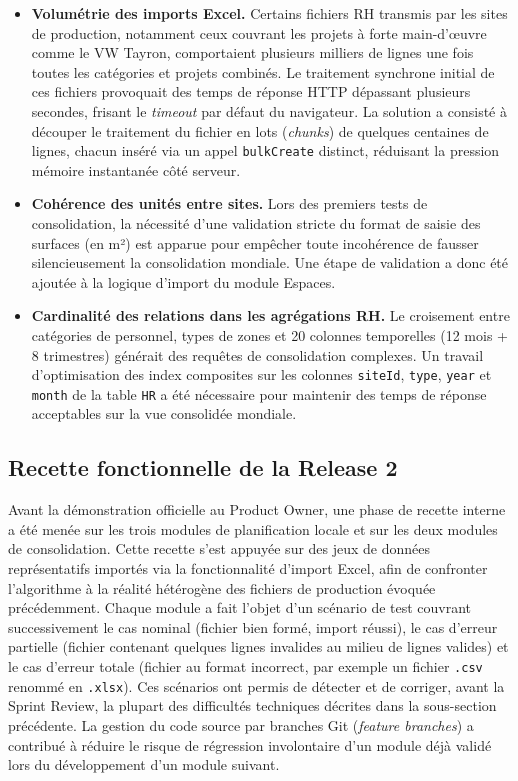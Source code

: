 \begin{itemize}
    \item \textbf{Volumétrie des imports Excel.} Certains fichiers RH transmis par les sites de production, notamment ceux couvrant les projets à forte main-d'œuvre comme le VW Tayron, comportaient plusieurs milliers de lignes une fois toutes les catégories et projets combinés. Le traitement synchrone initial de ces fichiers provoquait des temps de réponse HTTP dépassant plusieurs secondes, frisant le \textit{timeout} par défaut du navigateur. La solution a consisté à découper le traitement du fichier en lots (\textit{chunks}) de quelques centaines de lignes, chacun inséré via un appel \texttt{bulkCreate} distinct, réduisant la pression mémoire instantanée côté serveur.
    \item \textbf{Cohérence des unités entre sites.} Lors des premiers tests de consolidation, la nécessité d'une validation stricte du format de saisie des surfaces (en m²) est apparue pour empêcher toute incohérence de fausser silencieusement la consolidation mondiale. Une étape de validation a donc été ajoutée à la logique d'import du module Espaces.
    \item \textbf{Cardinalité des relations dans les agrégations RH.} Le croisement entre catégories de personnel, types de zones et 20 colonnes temporelles (12 mois + 8 trimestres) générait des requêtes de consolidation complexes. Un travail d'optimisation des index composites sur les colonnes \texttt{siteId}, \texttt{type}, \texttt{year} et \texttt{month} de la table \texttt{HR} a été nécessaire pour maintenir des temps de réponse acceptables sur la vue consolidée mondiale.
\end{itemize}

\subsection{Recette fonctionnelle de la Release 2}
Avant la démonstration officielle au Product Owner, une phase de recette interne a été menée sur les trois modules de planification locale et sur les deux modules de consolidation. Cette recette s'est appuyée sur des jeux de données représentatifs importés via la fonctionnalité d'import Excel, afin de confronter l'algorithme à la réalité hétérogène des fichiers de production évoquée précédemment. Chaque module a fait l'objet d'un scénario de test couvrant successivement le cas nominal (fichier bien formé, import réussi), le cas d'erreur partielle (fichier contenant quelques lignes invalides au milieu de lignes valides) et le cas d'erreur totale (fichier au format incorrect, par exemple un fichier \texttt{.csv} renommé en \texttt{.xlsx}). Ces scénarios ont permis de détecter et de corriger, avant la Sprint Review, la plupart des difficultés techniques décrites dans la sous-section précédente. La gestion du code source par branches Git (\textit{feature branches}) a contribué à réduire le risque de régression involontaire d'un module déjà validé lors du développement d'un module suivant.



